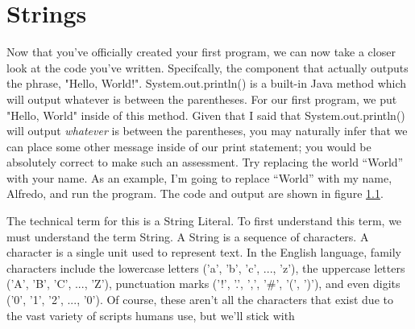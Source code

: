 

\chapter{Strings}


Now that you've officially created your first program, we can now take a closer look at the code you've written.
Specifcally, the component that actually outputs the phrase, "Hello, World!".
System.out.println() is a built-in Java method which will output whatever is between the parentheses.
For our first program, we put "Hello, World" inside of this method.
Given that I said that System.out.println() will output \textit{whatever} is between the parentheses, you may naturally infer that we can place some other message inside of our print statement; you would be absolutely correct to make such an assessment.
Try replacing the world ``World'' with your name.
As an example, I'm going to replace ``World'' with my name, Alfredo, and run the program.
The code and output are shown in figure \ref{fig:hello_alfredo}.

The technical term for this is a \gls{String Literal}.
To first understand this term, we must understand the term \gls{String}.
A String is a sequence of characters.
A \gls{character} is a single unit used to represent text.
In the English language, family characters include the lowercase letters ('a', 'b', 'c', ..., 'z'), the uppercase letters ('A', 'B', 'C', ..., 'Z'), punctuation marks ('!', '.', ',', '\#', '(', ')'), and even digits ('0', '1', '2', ..., '0').
Of course, these aren't all the characters that exist due to the vast variety of scripts humans use, but we'll stick with 




\begin{figure}
  \label{fig:hello_alfredo}
\end{figure}
